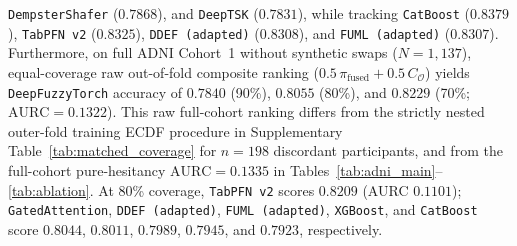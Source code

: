 \documentclass[10pt,twocolumn]{article}
\begin{document}
\texttt{DempsterShafer} ($0.7868$), and \texttt{DeepTSK} ($0.7831$), while tracking
\texttt{CatBoost} ($0.8379$), \texttt{TabPFN~v2} ($0.8325$), \texttt{DDEF (adapted)}
($0.8308$), and \texttt{FUML (adapted)} ($0.8307$). Furthermore, on full ADNI Cohort~1 without
synthetic swaps ($N=1,137$), equal-coverage raw
out-of-fold composite ranking ($0.5\,\pi_{\text{fused}}+0.5\,C_{\mathcal{O}}$) yields
\texttt{DeepFuzzyTorch} accuracy of $0.7840$ (90\%), $0.8055$ (80\%), and $0.8229$ (70\%;
$\text{AURC}=0.1322$). This raw full-cohort ranking differs from the strictly nested outer-fold
training ECDF procedure in Supplementary Table~\ref{tab:matched_coverage} for $n=198$
discordant
participants,
and from the full-cohort pure-hesitancy $\text{AURC}=0.1335$ in
Tables~\ref{tab:adni_main}--\ref{tab:ablation}. At 80\% coverage, \texttt{TabPFN~v2} scores
$0.8209$ (AURC $0.1101$); \texttt{GatedAttention}, \texttt{DDEF (adapted)},
\texttt{FUML (adapted)}, \texttt{XGBoost}, and \texttt{CatBoost} score $0.8044$, $0.8011$,
$0.7989$, $0.7945$, and $0.7923$, respectively.
\end{document}
